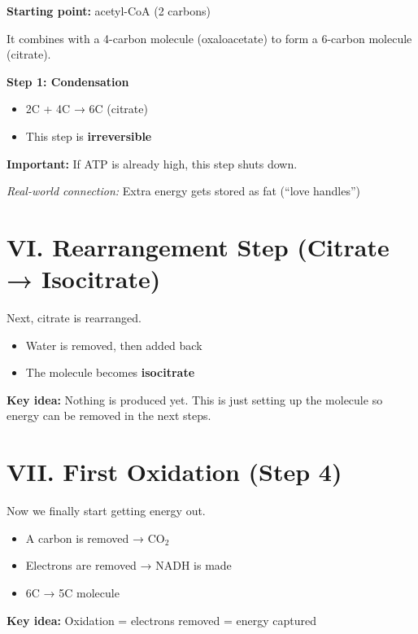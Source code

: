 \documentclass[9pt]{article}
\begin{document}
\medskip
\textbf{Starting point:} acetyl-CoA (2 carbons)

It combines with a 4-carbon molecule (oxaloacetate) to form a 6-carbon molecule (citrate).

\medskip
\textbf{Step 1: Condensation}

\begin{itemize}
\item 2C + 4C → 6C (citrate)
\item This step is \textbf{irreversible}
\end{itemize}

\textbf{Important:}  
If ATP is already high, this step shuts down.

\textit{Real-world connection:}  
Extra energy gets stored as fat (“love handles”)


\section*{VI. Rearrangement Step (Citrate → Isocitrate)}

Next, citrate is rearranged.

\begin{itemize}
\item Water is removed, then added back
\item The molecule becomes \textbf{isocitrate}
\end{itemize}

\textbf{Key idea:}  
Nothing is produced yet. This is just setting up the molecule so energy can be removed in the next steps.


\section*{VII. First Oxidation (Step 4)}

Now we finally start getting energy out.

\begin{itemize}
\item A carbon is removed → CO$_2$
\item Electrons are removed → NADH is made
\item 6C → 5C molecule
\end{itemize}

\textbf{Key idea:}  
Oxidation = electrons removed = energy captured
\end{document}
